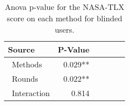 
\begin{table}[!htb]
\centering
\caption{Anova p-value for the NASA-TLX score on each method for blinded users.}
\label{tab:blocanova_nasa_avg_two_way_blind}
\begin{tabular}{lrrrrl}
\toprule
          Source & P-Value \\
\midrule
    \    Methods & 0.029** \\
     \    Rounds & 0.022** \\
\    Interaction &   0.814 \\
\bottomrule
\end{tabular}
\end{table}

